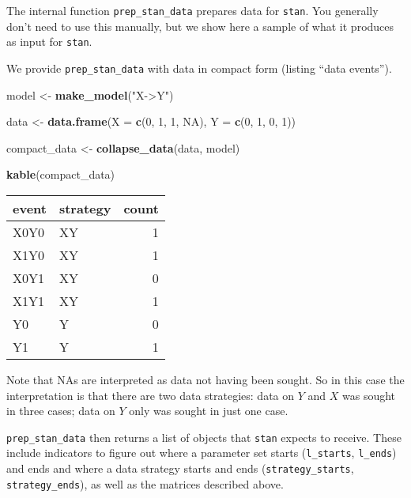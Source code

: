 \documentclass[
  12pt,
]{book}
\newenvironment{Shaded}{\begin{snugshade}}{\end{snugshade}}
\newcommand{\AttributeTok}[1]{\textcolor[rgb]{0.13,0.29,0.53}{#1}}
\newcommand{\ConstantTok}[1]{\textcolor[rgb]{0.56,0.35,0.01}{#1}}
\newcommand{\DecValTok}[1]{\textcolor[rgb]{0.00,0.00,0.81}{#1}}
\newcommand{\FunctionTok}[1]{\textcolor[rgb]{0.13,0.29,0.53}{\textbf{#1}}}
\newcommand{\NormalTok}[1]{#1}
\newcommand{\OtherTok}[1]{\textcolor[rgb]{0.56,0.35,0.01}{#1}}
\newcommand{\StringTok}[1]{\textcolor[rgb]{0.31,0.60,0.02}{#1}}
\begin{document}
The internal function \texttt{prep\_stan\_data} prepares data for \texttt{stan}. You generally don't need to use this manually, but we show here a sample of what it produces as input for \texttt{stan}.

We provide \texttt{prep\_stan\_data} with data in compact form (listing ``data events'').

\begin{Shaded}
\begin{Highlighting}[]
\NormalTok{model }\OtherTok{\textless{}{-}} \FunctionTok{make\_model}\NormalTok{(}\StringTok{"X{-}\textgreater{}Y"}\NormalTok{)}

\NormalTok{data  }\OtherTok{\textless{}{-}} \FunctionTok{data.frame}\NormalTok{(}\AttributeTok{X =} \FunctionTok{c}\NormalTok{(}\DecValTok{0}\NormalTok{, }\DecValTok{1}\NormalTok{, }\DecValTok{1}\NormalTok{, }\ConstantTok{NA}\NormalTok{), }\AttributeTok{Y =} \FunctionTok{c}\NormalTok{(}\DecValTok{0}\NormalTok{, }\DecValTok{1}\NormalTok{, }\DecValTok{0}\NormalTok{, }\DecValTok{1}\NormalTok{)) }

\NormalTok{compact\_data }\OtherTok{\textless{}{-}}  \FunctionTok{collapse\_data}\NormalTok{(data, model) }

\FunctionTok{kable}\NormalTok{(compact\_data)}
\end{Highlighting}
\end{Shaded}

\begin{tabular}{l|l|r}
\hline
event & strategy & count\\
\hline
X0Y0 & XY & 1\\
\hline
X1Y0 & XY & 1\\
\hline
X0Y1 & XY & 0\\
\hline
X1Y1 & XY & 1\\
\hline
Y0 & Y & 0\\
\hline
Y1 & Y & 1\\
\hline
\end{tabular}

Note that NAs are interpreted as data not having been sought. So in this case the interpretation is that there are two data strategies: data on \(Y\) and \(X\) was sought in three cases; data on \(Y\) only was sought in just one case.

\texttt{prep\_stan\_data} then returns a list of objects that \texttt{stan} expects to receive. These include indicators to figure out where a parameter set starts (\texttt{l\_starts}, \texttt{l\_ends}) and ends and where a data strategy starts and ends (\texttt{strategy\_starts}, \texttt{strategy\_ends}), as well as the matrices described above.
\end{document}
